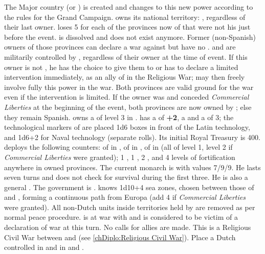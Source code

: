 
\phevnt
\aparag The Major country \paysmajeurHollande (or \HOL) is created and
\MAJHOLx changes to this new power according to the rules for the Grand
Campaign.
\aparag \HOL owns its national territory: ,
regardless of their last owner. \SPA loses 5 \VP for each of the provinces now
of \HOL that were not his just before the event. \paysprovincesne is dissolved
and does not exist anymore.
\bparag Former (non-Spanish) owners of those provinces can declare a war
against \HOL but have no \CB.
\aparag\label{onlyfirstrevolt1} \provinceBrabant and \provinceLimburg are
militarily controlled by \HOL, regardless of their owner at the time of event.
\bparag If this owner is not \SPA, he has the choice to give them to \HOL or
has to declare a limited intervention immediately, as an ally of \SPA in the
Religious War; \HOL may then freely involve fully this power in the war. Both
provinces are valid ground for the war even if the intervention is limited.
\bparag If the owner was \SPA and \SPA conceded \emph{Commercial Liberties} at
the beginning of the event, both provinces are now owned by \HOL; else they
remain Spanish.
\aparag \SPA owns a \Presidio of level 3 in \provinceZeeland.
\aparag \HOL has a \STAB of {\bf +2}, a \DTI and a \FTI of 3; the
technological markers of \HOL are placed 1d6 boxes in front of the Latin
technology, and 1d6+2 for Naval technology (separate rolls). Its initial Royal
Treasury is 400\ducats.
\aparag \HOL deploys the following counters: \MNU of  in
\provinceZeeland, of  in \provinceUtrecht, of  in
\provinceGelderland (all of level 1, level 2 if \emph{Commercial Liberties}
were granted); 1 \ARMY\facemoins, 1 \FLEET\faceplus, 2 \DT, and 4 levels of
fortification anywhere in owned provinces.
\aparag\label{onlyfirstrevolt2} The current \HOL monarch is
 with values 7/9/9. He lasts seven turns and does not check
for survival during the first three. He is also a general
. The government is .
\aparag\label{onlyfirstrevolt3} \HOL knows 1d10+4 sea zones,
chosen between those of \SPA and \POR, forming a continuous path from Europa
(add 4 if \emph{Commercial Liberties} were granted).
\aparag All non-Dutch units inside territories held by \HOL are removed as per
normal peace procedure.
\aparag \HOL is at war with \SPA and \SPA is considered to be victim of a
declaration of war at this turn. No calls for allies are made.  This is a
Religious Civil War between \HOL and \SPA (see \ref{chDiplo:Religious Civil
  War}).
\aparag\label{onlyfirstrevolt4} Place a Dutch controlled \REVOLT \faceplus in
\provinceVlaanderen and \REVOLT \facemoins in \provinceFlandre and
\provinceHainaut.

